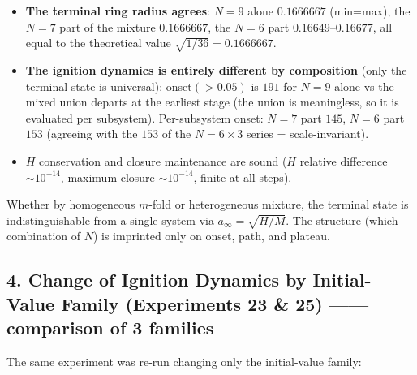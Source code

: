\documentclass[
  a4paper,
]{ltjsarticle}
\providecommand{\tightlist}{%
  \setlength{\itemsep}{0pt}\setlength{\parskip}{0pt}}
\begin{document}
\begin{itemize}
\tightlist
\item
  \textbf{The terminal ring radius agrees}: \(N=9\) alone \(0.1666667\)
  (min=max), the \(N=7\) part of the mixture \(0.1666667\), the \(N=6\)
  part \(0.16649\)--\(0.16677\), all equal to the theoretical value
  \(\sqrt{1/36}=0.1666667\).
\item
  \textbf{The ignition dynamics is entirely different by composition}
  (only the terminal state is universal): onset\((>0.05)\) is \(191\)
  for \(N=9\) alone vs the mixed union departs at the earliest stage
  (the union is meaningless, so it is evaluated per subsystem).
  Per-subsystem onset: \(N=7\) part \(145\), \(N=6\) part \(153\)
  (agreeing with the \(153\) of the \(N=6\times3\) series =
  scale-invariant).
\item
  \(H\) conservation and closure maintenance are sound (\(H\) relative
  difference \(\sim10^{-14}\), maximum closure \(\sim10^{-14}\), finite
  at all steps).
\end{itemize}

Whether by homogeneous \(m\)-fold or heterogeneous mixture, the terminal
state is indistinguishable from a single system via
\(a_\infty=\sqrt{H/M}\). The structure (which combination of \(N\)) is
imprinted only on onset, path, and plateau.

\subsection{4. Change of Ignition Dynamics by Initial-Value Family
(Experiments 23 \& 25) ------ comparison of 3
families}\label{change-of-ignition-dynamics-by-initial-value-family-experiments-23-25-comparison-of-3-families}

The same experiment was re-run changing only the initial-value family:
\end{document}
